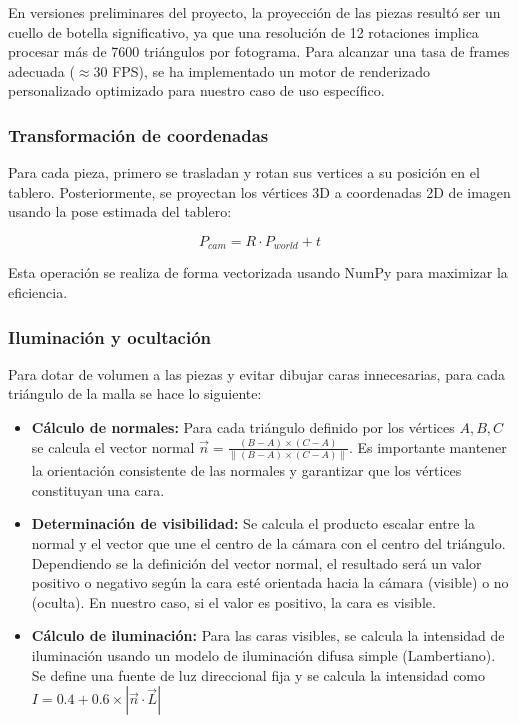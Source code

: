 \documentclass[11pt,a4paper]{article}
\begin{document}
En versiones preliminares del proyecto, la proyección de las piezas resultó ser un cuello
de botella significativo, ya que una resolución de 12 rotaciones implica procesar más de 7600 triángulos por fotograma.
Para alcanzar una tasa de frames adecuada ($\approx$30 FPS), se ha implementado un motor de renderizado personalizado optimizado para nuestro caso de uso específico.

\subsubsection{Transformación de coordenadas}

Para cada pieza, primero se trasladan y rotan sus vertices a su posición en el tablero.
Posteriormente, se proyectan los vértices 3D a coordenadas 2D de imagen usando la pose estimada del tablero:

\begin{equation}
P_{cam} = R \cdot P_{world} + t
\end{equation}

Esta operación se realiza de forma vectorizada usando NumPy para maximizar la eficiencia.

\subsubsection{Iluminación y ocultación}

Para dotar de volumen a las piezas y evitar dibujar caras innecesarias, para cada triángulo de la malla se hace lo siguiente:
\begin{itemize}
    \item \textbf{Cálculo de normales:} Para cada triángulo definido por los vértices $A, B, C$ se calcula el vector normal $\vec{n}=\frac{(B-A) \times (C-A)}{\|(B-A) \times (C-A)\|}$. Es importante mantener la orientación consistente de las normales y garantizar que los vértices constituyan una cara.
    \item \textbf{Determinación de visibilidad:} Se calcula el producto escalar entre la normal y el vector que une el centro de la cámara con el centro del triángulo. Dependiendo se la definición del vector normal, el resultado será un valor positivo o negativo según la cara esté orientada hacia la cámara (visible) o no (oculta).
    En nuestro caso, si el valor es positivo, la cara es visible.
    \item \textbf{Cálculo de iluminación:} Para las caras visibles, se calcula la intensidad de iluminación usando un modelo de iluminación difusa simple (Lambertiano). Se define una fuente de luz direccional fija y se calcula la intensidad como $I=0.4+0.6\times |\vec{n}\cdot\vec{L}|$
\end{itemize}
\end{document}
